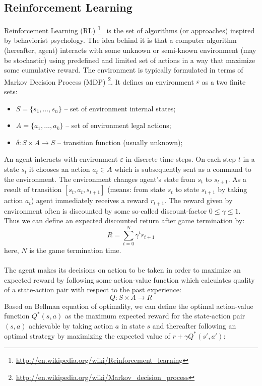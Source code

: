 \documentclass[a4paper,oneside,dvipsnames]{article}
\begin{document}
\subsection[Reinforcement Learning]{Reinforcement Learning}
Reinforcement Learning (RL)
\footnote{\url{http://en.wikipedia.org/wiki/Reinforcement\_learning}}
\ is the set of algorithms (or approaches) inspired by behaviorist psychology. The idea behind it is that a computer algorithm (hereafter, agent) interacts with some unknown or semi-known environment (may be stochastic) using predefined and limited set of actions in a way that maximize some cumulative reward. The environment is typically formulated in terms of Markov Decision Process (MDP) \footnote{\url{http://en.wikipedia.org/wiki/Markov\_decision\_process}}. It defines an environment $\varepsilon$ as a two finite sets:
\begin{itemize}
    \item $S = \{s_1,\dots,s_n\}$ -- set of environment internal states;
    \item $A = \{a_1,\dots,a_k\}$ -- set of environment legal actions;
    \item $\delta : S \times A \to S$ -- transition function (usually unknown);
\end{itemize}
An agent interacts with environment $\varepsilon$ in discrete time steps. On each step $t$ in a state $s_t$ it chooses an action $a_t \in A$ which is subsequently sent as a command to the environment. The environment changes agent's state from $s_t$ to $s_{t+1}$. As a result of transition $[s_t, a_t, s_{t+1}]$ (means: from state $s_t$ to state $s_{t+1}$ by taking action $a_t$) agent immediately receives a reward $r_{t+1}$. The reward given by environment often is discounted by some so-called discount-factor $0\leq\gamma\leq1$.
Thus we can define an expected discounted return after game termination by:
\begin{equation} \label{eq:reward}
    R = \sum_{t=0}^{N} \gamma^t r_{t+1}
\end{equation}
here, $N$ is the game termination time.\\\\
The agent makes its decisions on action to be taken in order to maximize an expected reward by following some action-value function which calculates quality of a state-action pair with respect to the past experience:
\begin{equation} \label{eq:quality}
    Q : S \times A \to R
\end{equation}
Based on Bellman equation of optimality, we can define the optimal action-value function  $Q^*(s,a)$ as the maximum expected reward for the state-action pair $(s,a)$ achievable by taking action $a$ in state $s$ and thereafter following an optimal strategy by maximizing the expected value of $r + \gamma Q^*(s', a')$:
\end{document}
